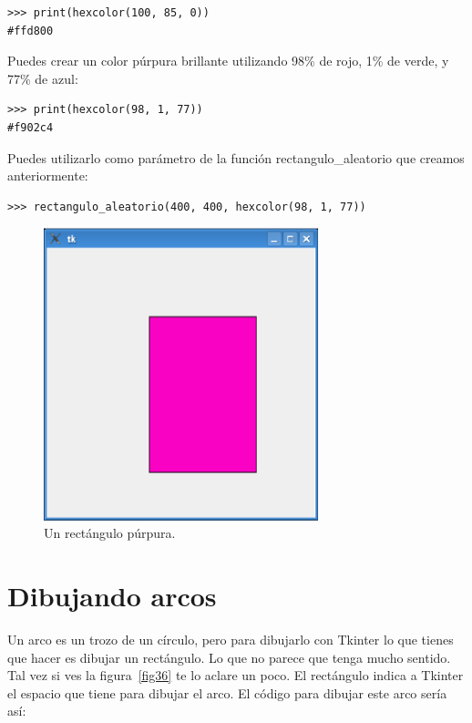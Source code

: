 \begin{listing}
\begin{verbatim}
>>> print(hexcolor(100, 85, 0))
#ffd800
\end{verbatim}
\end{listing}

\noindent
Puedes crear un color púrpura brillante utilizando 98\% de rojo, 1\% de verde, y 77\% de azul:

\begin{listing}
\begin{verbatim}
>>> print(hexcolor(98, 1, 77))
#f902c4
\end{verbatim}
\end{listing}

\noindent
Puedes utilizarlo como parámetro de la función rectangulo\_aleatorio que creamos anteriormente: 

\begin{listing}
\begin{verbatim}
>>> rectangulo_aleatorio(400, 400, hexcolor(98, 1, 77))
\end{verbatim}
\end{listing}

\begin{figure}
\begin{center}
\includegraphics[width=80mm]{figure35.eps}
\end{center}
\caption{Un rectángulo púrpura.}\label{fig35}
\end{figure}

\section{Dibujando arcos}

Un arco es un trozo de un círculo, pero para dibujarlo con Tkinter lo que tienes que hacer es dibujar un rectángulo. Lo que no parece que tenga mucho sentido. Tal vez si ves la figura~\ref{fig36} te lo aclare un poco. El rectángulo indica a Tkinter el espacio que tiene para dibujar el arco.  El código para dibujar este arco sería así:

